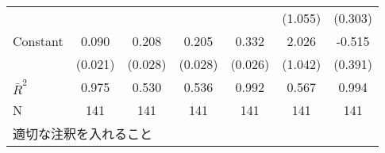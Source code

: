\begin{table}[htbp]
\begin{tabular}{l*{6}{c}}
                    &                     &                     &                     &                     &     (1.055)         &     (0.303)         \\
Constant            &       0.090\sym{***}&       0.208\sym{***}&       0.205\sym{***}&       0.332\sym{***}&       2.026         &      -0.515         \\
                    &     (0.021)         &     (0.028)         &     (0.028)         &     (0.026)         &     (1.042)         &     (0.391)         \\
\hline
$\bar R^2$          &       0.975         &       0.530         &       0.536         &       0.992         &       0.567         &       0.994         \\
N                   &         141         &         141         &         141         &         141         &         141         &         141         \\
\hline\hline
\multicolumn{7}{l}{\footnotesize 適切な注釈を入れること}\\
\end{tabular}
\end{table}
